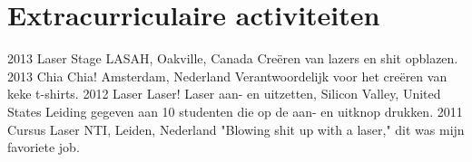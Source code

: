 \documentclass[]{friggeri-cv} %
\begin{document}

\section{Extracurriculaire activiteiten}
\begin{entrylist}
\entry
{2013}
{Laser Stage}
{LASAH, Oakville, Canada}
{Creëren van lazers en shit opblazen.}
\entry
{2013}
{Chia Chia!}
{Amsterdam, Nederland}
{Verantwoordelijk voor het creëren van keke t-shirts.}
\entry
{2012}
{Laser Laser!}
{Laser aan- en uitzetten, Silicon Valley, United States}
{Leiding gegeven aan 10 studenten die op de aan- en uitknop drukken.}
\entry
{2011}
{Cursus Laser}
{NTI, Leiden, Nederland}
{"Blowing shit up with a laser," dit was mijn favoriete job.}

\end{entrylist}
\end{document}
